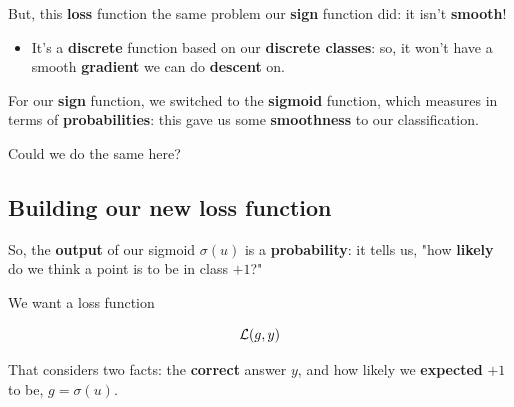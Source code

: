         But, this \textbf{loss} function the same problem our \textbf{sign} function did: it isn't \textbf{smooth}! 

        \begin{itemize}
            \item It's a \textbf{discrete} function based on our \textbf{discrete classes}: so, it won't have a smooth \textbf{gradient} we can do \textbf{descent} on.
        \end{itemize}
        
        For our \textbf{sign} function, we switched to the \textbf{sigmoid} function, which measures in terms of \textbf{probabilities}: this gave us some \textbf{smoothness} to our classification.
        
        Could we do the same here?
        
    \subsection{Building our new loss function}
    
        So, the \textbf{output} of our sigmoid $\sigma(u)$ is a \textbf{probability}: it tells us, "how \textbf{likely} do we think a point is to be in class $+1$?"
        
        We want a loss function
        
        \begin{equation}
            \mathcal{L}(g,y)
        \end{equation}
        
        That considers two facts: the \textbf{correct} answer $y$, and how likely we \textbf{expected} $+1$ to be, $g=\sigma(u)$.\\
        
